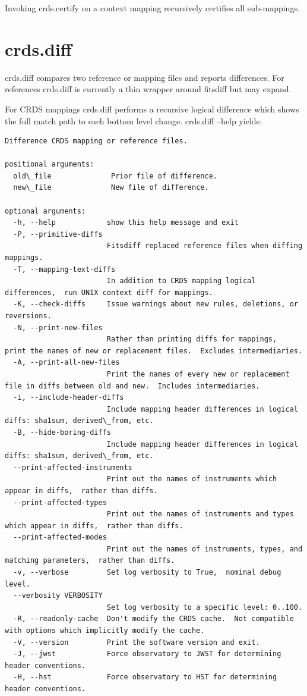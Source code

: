 \documentclass[letterpaper,10pt,english]{sphinxmanual}
\begin{document}
Invoking crds.certify on a context mapping recursively certifies all sub-mappings.


\section{crds.diff}
\label{command_line_tools:crds-diff}
crds.diff compares two reference or mapping files and reports differences.  For
references crds.diff is currently a thin wrapper around fitsdiff but may expand.

For CRDS mappings crds.diff performs a recursive logical difference which shows
the full match path to each bottom level change.   crds.diff --help yields:

\begin{Verbatim}[commandchars=\\\{\}]
Difference CRDS mapping or reference files.

positional arguments:
  old\_file              Prior file of difference.
  new\_file              New file of difference.

optional arguments:
  -h, --help            show this help message and exit
  -P, --primitive-diffs
                        Fitsdiff replaced reference files when diffing mappings.
  -T, --mapping-text-diffs
                        In addition to CRDS mapping logical differences,  run UNIX context diff for mappings.
  -K, --check-diffs     Issue warnings about new rules, deletions, or reversions.
  -N, --print-new-files
                        Rather than printing diffs for mappings,  print the names of new or replacement files.  Excludes intermediaries.
  -A, --print-all-new-files
                        Print the names of every new or replacement file in diffs between old and new.  Includes intermediaries.
  -i, --include-header-diffs
                        Include mapping header differences in logical diffs: sha1sum, derived\_from, etc.
  -B, --hide-boring-diffs
                        Include mapping header differences in logical diffs: sha1sum, derived\_from, etc.
  --print-affected-instruments
                        Print out the names of instruments which appear in diffs,  rather than diffs.
  --print-affected-types
                        Print out the names of instruments and types which appear in diffs,  rather than diffs.
  --print-affected-modes
                        Print out the names of instruments, types, and matching parameters,  rather than diffs.
  -v, --verbose         Set log verbosity to True,  nominal debug level.
  --verbosity VERBOSITY
                        Set log verbosity to a specific level: 0..100.
  -R, --readonly-cache  Don't modify the CRDS cache.  Not compatible with options which implicitly modify the cache.
  -V, --version         Print the software version and exit.
  -J, --jwst            Force observatory to JWST for determining header conventions.
  -H, --hst             Force observatory to HST for determining header conventions.


\end{Verbatim}
\end{document}
